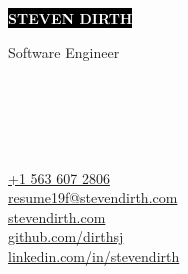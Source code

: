 \documentclass[9pt]{developercv} %
\begin{document}

\begin{minipage}[t]{0.5\textwidth} %
	\vspace{-\baselineskip} %

	\colorbox{black}{{\HUGE\textcolor{white}{\textbf{\MakeUppercase{Steven Dirth}}}}} %
	
	
	\vspace{6pt}
	
	{\huge Software Engineer} %
\end{minipage}
\begin{minipage}[t]{0.03\textwidth} %
	\vspace{-\baselineskip} %
	{\large
		\faPhone \\
		\faEnvelope \\
		\faLink \\
		\faGithub \\
		\faLinkedin
	}
\end{minipage}
\begin{minipage}[t]{0.47\textwidth} %
	\vspace{-\baselineskip} %
	{\large
		\href{tel:15636072806}{+1 563 607 2806} \\
		\href{mailto:resume19f@stevendirth.com}{resume19f@stevendirth.com} \\
		\href{https://stevendirth.com}{stevendirth.com} \\
		\href{https://github.com/dirthsj}{github.com/dirthsj} \\
		\href{https://linkedin.com/in/stevendirth}{linkedin.com/in/stevendirth}
	}
\end{minipage}

\vspace{0.5cm}
\end{document}
